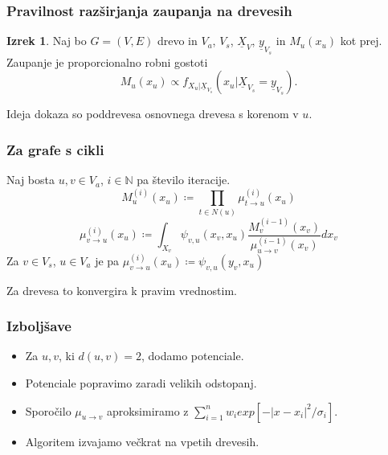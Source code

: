 \documentclass{beamer}
\renewcommand{\vec}{\underline}
\theoremstyle{definition}
\newtheorem{izrek}{Izrek}
\begin{document}
  \begin{frame}
    \frametitle{Pravilnost razširjanja zaupanja na drevesih}
    \begin{izrek}
      Naj bo $G = \left(V, E\right)$ drevo in $V_a$, $V_s$, $\vec{X}_V$,
      $\vec{y}_{V_s}$ in $M_u\left(x_u\right)$ kot prej.
      Zaupanje je proporcionalno robni gostoti
      $$
      M_u\left(x_u\right) \propto f_{X_u | \vec{X}_{V_s}}\left(x_u | \vec{X}_{V_s} = \vec{y}_{V_s}\right).
      $$
    \end{izrek}
    Ideja dokaza so poddrevesa osnovnega drevesa s korenom v $u$.
  \end{frame}

  \begin{frame}
    \frametitle{Za grafe s cikli}
    Naj bosta $u,v \in V_a$, $i \in \mathbb{N}$ pa število iteracije.
    $$
    M_u^{\left(i\right)}\left(x_u\right) \coloneqq
    \prod_{t \in N\left(u\right)}\mu^{\left(i\right)}_{t \to u}\left(x_u\right)
    $$
    $$
    \mu_{v \to u}^{\left(i\right)}\left(x_u\right) \coloneqq
    \int_{X_v} \psi_{v,u}\left(x_v,x_u\right)
    \frac{
      M_v^{\left(i-1\right)}\left(x_v\right)}{
      \mu_{u \to v}^{\left(i-1\right)}\left(x_v\right)
    }dx_v
    $$
    Za $v \in V_s$, $u \in V_a$ je pa
    $\mu_{v \to u}^{\left(i\right)}\left(x_u\right) \coloneqq \psi_{v,u}\left(y_v, x_u\right)$

    Za drevesa to konvergira k pravim vrednostim.
  \end{frame}

  \begin{frame}
    \frametitle{Izboljšave}
    \begin{itemize}
      \item Za $u,v$, ki $d\left(u,v\right) = 2$, dodamo potenciale.
      \item Potenciale popravimo zaradi velikih odstopanj.
      \item Sporočilo $\mu_{u \to v}$ aproksimiramo z
        $\sum_{i=1}^{n}w_i exp\left[-\left|x-x_i\right|^2/\sigma_i\right]$.
      \item Algoritem izvajamo večkrat na vpetih drevesih.
    \end{itemize}
  \end{frame}
\end{document}
